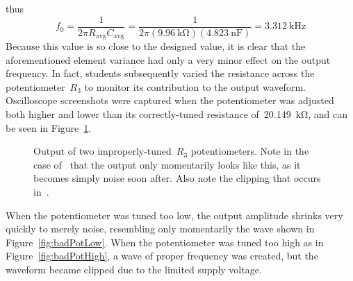thus
\begin{equation*}
	f_0 = \frac{1}{2 \pi R_\text{avg} C_\text{avg}}
		= \frac{1}{2 \pi (\SI{9.96}{\kilo\ohm}) (\SI{4.823}{\nano\farad})}
		= \SI{3.312}{\kilo\hertz}
\end{equation*}
%
Because this value is so close to the designed value, it is clear that the
aforementioned element variance had only a very minor effect on the output
frequency.  In fact, students subsequently varied the resistance across the
potentiometer~$R_3$ to monitor its contribution to the output waveform.
Oscilloscope screenshots were captured when the potentiometer was adjusted both
higher and lower than its correctly-tuned resistance of~\SI{20.149}{\kilo\ohm},
and can be seen in Figure~\ref{fig:badPotShots}.
%
\begin{figure}[H]
	\centering
	\quad

	\parbox{.8\textwidth}{
	\caption{Output of two improperly-tuned~$R_3$ potentiometers.  Note in the
	case of~ that the output only momentarily looks like
	this, as it becomes simply noise soon after.  Also note the clipping that
	occurs in~.}
	\label{fig:badPotShots}}
\end{figure}
%
When the potentiometer was tuned too low, the output amplitude shrinks very
quickly to merely noise, resembling only momentarily the wave shown in
Figure~\ref{fig:badPotLow}.  When the potentiometer was tuned too high as in
Figure~\ref{fig:badPotHigh}, a wave of proper frequency was created, but the
waveform became clipped due to the limited supply voltage.

